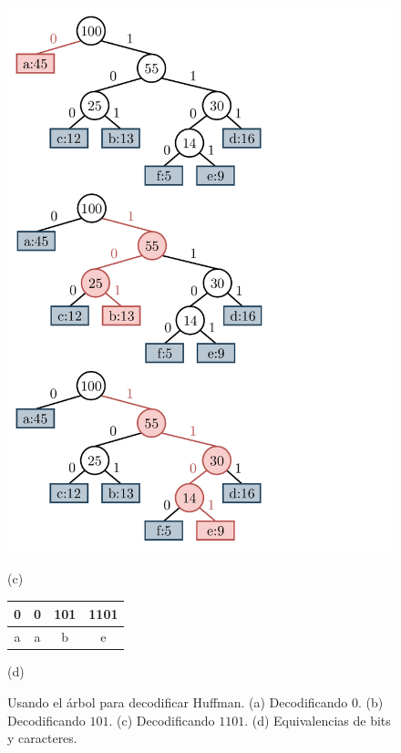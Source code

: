 \begin{figure}
    	\begin{minipage}{1\textwidth}
    		\centering
    		\begin{minipage}{0.45\textwidth}
    			\centering
    			\includegraphics[scale=.4, clip, trim=10 20 200 550]{img/graphs-huffmanBack.pdf}
    			
    			(c)
    		\end{minipage}  
    		\begin{minipage}{0.45\textwidth}
    			\centering
			\begin{tabular}{cccc}
				0 & 0 & 101 & 1101 \\
				\midrule
				a & a & b & e \\
			\end{tabular}
		    	\vspace{5mm}
		    	
    			(d)
    		\end{minipage}  
    	\end{minipage}
    	
    	 
    \caption{Usando el árbol para decodificar Huffman. (a) Decodificando $0$. (b) Decodificando $101$. (c) Decodificando $1101$. (d) Equivalencias de bits y caracteres.}
    \label{fig:huffmanBack}
\end{figure}
